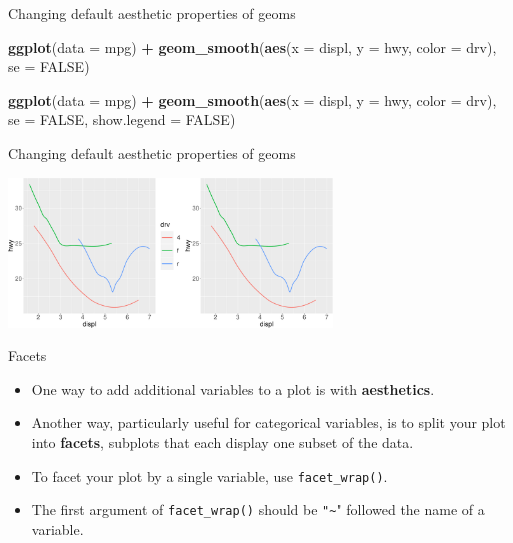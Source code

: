 \documentclass[ignorenonframetext,]{beamer}
\newenvironment{Shaded}{\begin{snugshade}}{\end{snugshade}}
\newcommand{\DataTypeTok}[1]{\textcolor[rgb]{0.13,0.29,0.53}{#1}}
\newcommand{\KeywordTok}[1]{\textcolor[rgb]{0.13,0.29,0.53}{\textbf{#1}}}
\newcommand{\NormalTok}[1]{#1}
\newcommand{\OperatorTok}[1]{\textcolor[rgb]{0.81,0.36,0.00}{\textbf{#1}}}
\newcommand{\OtherTok}[1]{\textcolor[rgb]{0.56,0.35,0.01}{#1}}
\newcommand{\StringTok}[1]{\textcolor[rgb]{0.31,0.60,0.02}{#1}}
\begin{document}
\begin{frame}[fragile]{Changing default aesthetic properties of geoms}
\protect\hypertarget{changing-default-aesthetic-properties-of-geoms-36}{}

\begin{Shaded}
\begin{Highlighting}[]
\KeywordTok{ggplot}\NormalTok{(}\DataTypeTok{data =}\NormalTok{ mpg) }\OperatorTok{+}\StringTok{ }
\StringTok{  }\KeywordTok{geom_smooth}\NormalTok{(}\KeywordTok{aes}\NormalTok{(}\DataTypeTok{x =}\NormalTok{ displ, }\DataTypeTok{y =}\NormalTok{ hwy, }\DataTypeTok{color =}\NormalTok{ drv),}
    \DataTypeTok{se =} \OtherTok{FALSE}\NormalTok{)}

\KeywordTok{ggplot}\NormalTok{(}\DataTypeTok{data =}\NormalTok{ mpg) }\OperatorTok{+}\StringTok{ }
\StringTok{  }\KeywordTok{geom_smooth}\NormalTok{(}\KeywordTok{aes}\NormalTok{(}\DataTypeTok{x =}\NormalTok{ displ, }\DataTypeTok{y =}\NormalTok{ hwy, }\DataTypeTok{color =}\NormalTok{ drv),}
    \DataTypeTok{se =} \OtherTok{FALSE}\NormalTok{, }\DataTypeTok{show.legend =} \OtherTok{FALSE}\NormalTok{)}
\end{Highlighting}
\end{Shaded}

\end{frame}

\begin{frame}{Changing default aesthetic properties of geoms}
\protect\hypertarget{changing-default-aesthetic-properties-of-geoms-37}{}

\begin{center}\includegraphics[height=150px]{data-visualization_files/figure-beamer/unnamed-chunk-69-1} \end{center}

\end{frame}

\begin{frame}[fragile]{Facets}
\protect\hypertarget{facets}{}

\begin{itemize}
\item
  One way to add additional variables to a plot is with
  \textbf{aesthetics}.
\item
  Another way, particularly useful for categorical variables, is to
  split your plot into \textbf{facets}, subplots that each display one
  subset of the data.
\item
  To facet your plot by a single variable, use \texttt{facet\_wrap()}.
\item
  The first argument of \texttt{facet\_wrap()} should be
  \texttt{"\textasciitilde{}}" followed the name of a variable.
\end{itemize}

\end{frame}
\end{document}
